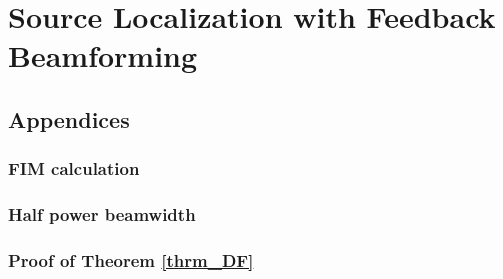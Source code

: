 \chapter{Source Localization with Feedback Beamforming}
\label{chap:firstchap}
% 



\section{Appendices}
\subsection{FIM calculation}
\label{apdx_clacFim}

\subsection{Half power beamwidth}
\label{apdx_HPBW}

\subsection{Proof of Theorem \ref{thrm_DF}}
\label{apdx_thrm_DF}
